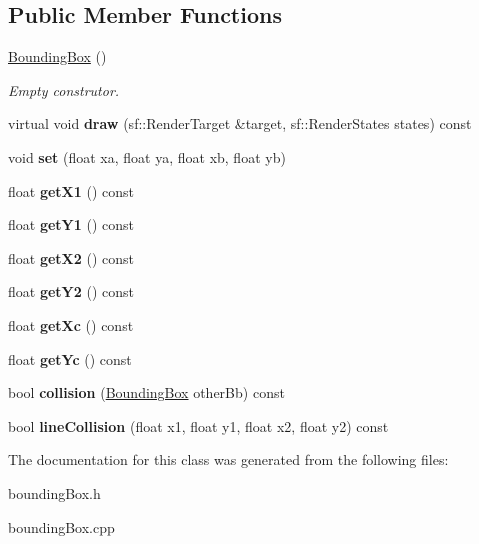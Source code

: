 \subsection*{Public Member Functions}
\begin{DoxyCompactItemize}
\item 
\mbox{\label{class_bounding_box_a6e401c4da5839950f1f30c8b8c4d1208}} 
\mbox{\hyperlink{class_bounding_box_a6e401c4da5839950f1f30c8b8c4d1208}{Bounding\+Box}} ()
\begin{DoxyCompactList}\small\item\em Empty construtor. \end{DoxyCompactList}\item 
\mbox{\label{class_bounding_box_ae43a16b23a21e4a1e2555033839b8a87}} 
virtual void {\bfseries draw} (sf\+::\+Render\+Target \&target, sf\+::\+Render\+States states) const
\item 
\mbox{\label{class_bounding_box_aff19c04b931017df2c5bb499ac251896}} 
void {\bfseries set} (float xa, float ya, float xb, float yb)
\item 
\mbox{\label{class_bounding_box_a6f709d06496c1804f0106cfd2ee8a0c8}} 
float {\bfseries get\+X1} () const
\item 
\mbox{\label{class_bounding_box_a99cee35b530aabcc207c2a42c6ac5ba6}} 
float {\bfseries get\+Y1} () const
\item 
\mbox{\label{class_bounding_box_a8be853a7269e34b87065ada4303f4b9d}} 
float {\bfseries get\+X2} () const
\item 
\mbox{\label{class_bounding_box_a52d540e2b74fe63af7671b5767cc0cec}} 
float {\bfseries get\+Y2} () const
\item 
\mbox{\label{class_bounding_box_a89d92b61c3b25a6b2c05f3682e0f11f2}} 
float {\bfseries get\+Xc} () const
\item 
\mbox{\label{class_bounding_box_a145497b1a9064596397224e7b15702c9}} 
float {\bfseries get\+Yc} () const
\item 
\mbox{\label{class_bounding_box_a2e443c907694f79293bdef5dedfd9319}} 
bool {\bfseries collision} (\mbox{\hyperlink{class_bounding_box}{Bounding\+Box}} other\+Bb) const
\item 
\mbox{\label{class_bounding_box_a406de3f6c30f7bdc1fb0bbb840144c71}} 
bool {\bfseries line\+Collision} (float x1, float y1, float x2, float y2) const
\end{DoxyCompactItemize}


The documentation for this class was generated from the following files\+:\begin{DoxyCompactItemize}
\item 
bounding\+Box.\+h\item 
bounding\+Box.\+cpp\end{DoxyCompactItemize}
